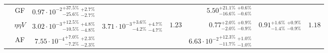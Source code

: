 \begin{table}[t!]
\begin{center}
{\begin{tabular}{c | c | r r c || r r c}
 & GF & ${0.97 \cdot 10^{-2}}^{+37.5\%}_{-25.6\%}\ ^{+2.7\%}_{-2.7\%}$ &  &  & $5.50^{+21.1\%}_{-16.6\%}\ ^{+0.6\%}_{-0.6\%}$ &  &  \\
 & $\eta\eta V$ & ${3.02 \cdot 10^{-3}}^{+12.5\%}_{-10.5\%}\ ^{+4.8\%}_{-4.8\%}$ & ${3.71 \cdot 10^{-3}}^{+3.6\%}_{-4.2\%}\ ^{+4.7\%}_{-4.7\%}$ & $1.23$ & $0.77^{+2.0\%}_{-2.0\%}\ ^{+0.9\%}_{-0.9\%}$ & $0.91^{+1.6\%}_{-1.4\%}\ ^{+0.9\%}_{-0.9\%}$ & $1.18$ \\
 & AF & ${7.55 \cdot 10^{-4}}^{+7.0\%}_{-7.2\%}\ ^{+2.3\%}_{-2.3\%}$ &  &  & ${6.63 \cdot 10^{-2}}^{+12.3\%}_{-11.7\%}\ ^{+1.0\%}_{-1.0\%}$ &  &  \\
\hline
\hline
\end{tabular}
} \end{center}
\end{table}